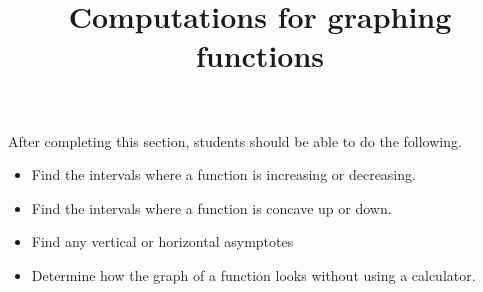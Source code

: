 \documentclass{ximera}
\title{Computations for graphing functions}
\begin{document}
\begin{abstract}
\end{abstract}

\maketitle

\begin{sectionOutcomes}

After completing this section, students should be able to do the following.

\begin{itemize}
\item Find the intervals where a function is increasing or decreasing.
\item Find the intervals where a function is concave up or down.
\item Find any  vertical or horizontal asymptotes
\item Determine how the graph of a function looks without using a calculator.
\end{itemize}

\end{sectionOutcomes}
\end{document}
